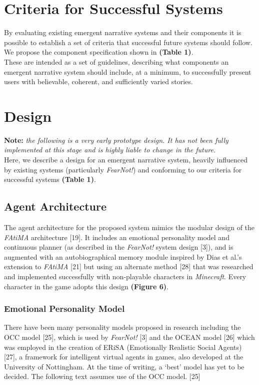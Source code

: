 \documentclass{sig-alternate-05-2015}
\begin{document}
\section{Criteria for Successful Systems}
\noindent By evaluating existing emergent narrative systems and their components it is possible to establish a set of criteria that successful future systems should follow. We propose the component specification shown in \textbf{(Table 1)}.\\

These are intended as a set of guidelines, describing what components an emergent narrative system should include, at a minimum, to successfully present users with believable, coherent, and sufficiently varied stories.


\newpage
\section{Design}
\noindent \textbf{Note:} \textit{the following is a very early prototype design. It has not been fully implemented at this stage and is highly liable to change in the future.}\\

\noindent Here, we describe a design for an emergent narrative system, heavily influenced by existing systems (particularly \textit{FearNot!}) and conforming to our criteria for successful systems \textbf{(Table 1)}. 

\subsection{Agent Architecture}
\noindent The agent architecture for the proposed system mimics the modular design of the \textit{FAtiMA} architecture [19]. It includes an emotional personality model and continuous planner (as described in the \textit{FearNot!} system design [3]), and is augmented with an autobiographical memory module inspired by Dias et al.'s extension to \textit{FAtiMA} [21] but using an alternate method [28] that was researched and implemented successfully with non-playable characters in \textit{Minecraft}. Every character in the game adopts this design \textbf{(Figure 6)}.

\subsubsection{Emotional Personality Model} 
\noindent There have been many personality models proposed in research including the OCC model [25], which is used by \textit{FearNot!} [3] and the OCEAN model [26] which was employed in the creation of ERiSA (Emotionally Realistic Social Agents) [27], a framework for intelligent virtual agents in games, also developed at the University of Nottingham. At the time of writing, a `best' model has yet to be decided. The following text assumes use of the OCC model. [25]\\
\end{document}
